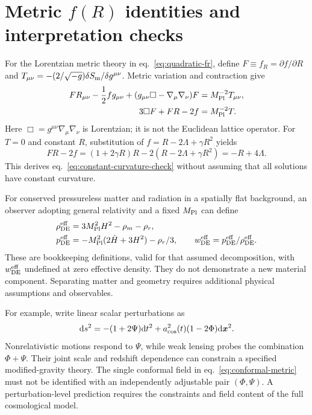 \section{Metric \texorpdfstring{$f(R)$}{f(R)} identities and interpretation checks}
\label{app:cosmological-identities}

For the Lorentzian metric theory in eq.~\eqref{eq:quadratic-fr}, define $F\equiv f_R=\partial f/\partial R$ and $T_{\mu\nu}=-(2/\sqrt{-g})\delta S_{\rm m}/\delta g^{\mu\nu}$.  Metric variation and contraction give~\cite{DeFeliceTsujikawa:2010}
\begin{align}
 F R_{\mu\nu}-\frac12 f g_{\mu\nu}
 +(g_{\mu\nu}\Box-\nabla_\mu\nabla_\nu)F
 &=M_{\rm Pl}^{-2}T_{\mu\nu},\label{eq:fr-field-equations}\\
 3\Box F+FR-2f&=M_{\rm Pl}^{-2}T.\label{eq:fr-trace}
\end{align}
Here $\Box=g^{\mu\nu}\nabla_\mu\nabla_\nu$ is Lorentzian; it is not the Euclidean lattice operator.  For $T=0$ and constant $R$, substitution of $f=R-2\Lambda+\gamma R^2$ yields
\begin{equation}
 FR-2f=(1+2\gamma R)R-2(R-2\Lambda+\gamma R^2)
 =-R+4\Lambda.
\end{equation}
This derives eq.~\eqref{eq:constant-curvature-check} without assuming that all solutions have constant curvature.

For conserved pressureless matter and radiation in a spatially flat background, an observer adopting general relativity and a fixed $M_{\rm Pl}$ can define
\begin{align}
 \rho_{\rm DE}^{\rm eff}&=3M_{\rm Pl}^2H^2-\rho_m-\rho_r,\\
 p_{\rm DE}^{\rm eff}&=-M_{\rm Pl}^2(2\dot H+3H^2)-\rho_r/3,
 \qquad w_{\rm DE}^{\rm eff}=p_{\rm DE}^{\rm eff}/\rho_{\rm DE}^{\rm eff}.
\end{align}
These are bookkeeping definitions, valid for that assumed decomposition, with $w_{\rm DE}^{\rm eff}$ undefined at zero effective density.  They do not demonstrate a new material component.  Separating matter and geometry requires additional physical assumptions and observables.

For example, write linear scalar perturbations as
\begin{equation}
 \dd s^2=-(1+2\Psi)\dd t^2
 +a_{\rm cos}^2(t)(1-2\Phi)\dd\boldsymbol{x}^2.
\end{equation}
Nonrelativistic motions respond to $\Psi$, while weak lensing probes the combination $\Phi+\Psi$.  Their joint scale and redshift dependence can constrain a specified modified-gravity theory.  The single conformal field in eq.~\eqref{eq:conformal-metric} must not be identified with an independently adjustable pair $(\Phi,\Psi)$.  A perturbation-level prediction requires the constraints and field content of the full cosmological model.
